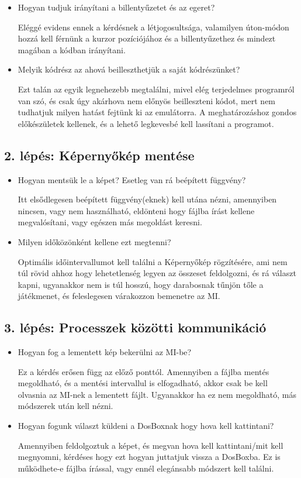 \begin{itemize}
    \item Hogyan tudjuk irányítani a billentyűzetet és az egeret?
    
    Eléggé evidens ennek a kérdésnek a létjogosultsága, valamilyen úton-módon hozzá kell férnünk a kurzor pozíciójához és a billentyűzethez és mindezt magában a kódban irányítani.  
    \item Melyik kódrész az ahová beilleszthetjük a saját kódrészünket?
    
    Ezt talán az egyik legnehezebb megtalálni, mivel elég terjedelmes programról van szó, és csak úgy akárhova nem előnyös beilleszteni kódot, mert nem tudhatjuk milyen hatást fejtünk ki az emulátorra. A meghatározáshoz gondos előkészületek kellenek, és a lehető legkevesbé kell lassítani a programot.
\end{itemize}

\subsection{2. lépés: Képernyőkép mentése}

\begin{itemize}
    \item Hogyan mentsük le a képet? Esetleg van rá beépített függvény?
    
    Itt elsődlegesen beépített függvény(eknek) kell utána nézni, amennyiben nincsen, vagy nem használható, eldönteni hogy fájlba írást kellene megvalósítani, vagy egészen más megoldást keresni.
    \item Milyen időközönként kellene ezt megtenni?
    
    Optimális időintervallumot kell találni a Képernyőkép rögzítésére, ami nem túl rövid ahhoz hogy lehetetlenség legyen az összeset feldolgozni, és rá választ kapni, ugyanakkor nem is túl hosszú, hogy darabosnak tűnjön tőle a játékmenet, és feleslegesen várakozzon bemenetre az MI.
\end{itemize}

\subsection{3. lépés: Processzek közötti kommunikáció}

\begin{itemize}
    \item Hogyan fog a lementett kép bekerülni az MI-be?
    
    Ez a kérdés erősen függ az előző ponttól. Amennyiben a fájlba mentés megoldható, és a mentési intervallul is elfogadható, akkor csak be kell olvasnia az MI-nek a lementett fájlt. Ugyanakkor ha ez nem megoldható, más módszerek után kell nézni.  
    
    \item Hogyan fogunk választ küldeni a DosBoxnak hogy hova kell kattintani?
    
    Amennyiben feldolgoztuk a képet, és megvan hova kell kattintani/mit kell megnyomni, kérdéses hogy ezt hogyan juttatjuk vissza a DosBoxba. Ez is működhete-e fájlba írással, vagy ennél elegánsabb módszert kell találni.  

\end{itemize}


